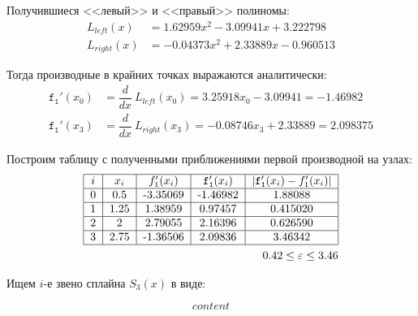 \documentclass[a4paper, 14pt]{article}
\begin{document}
Получившиеся <<левый>> и <<правый>> полиномы:
\begin{align}
    L_{left}(x)  &= 1.62959x^2 - 3.09941x + 3.222798\\
    L_{right}(x) &=-0.04373x^2 + 2.33889x - 0.960513
\end{align}

Тогда производные в крайних точках выражаются аналитически:
\begin{align}
    \mathtt{f_1'}(x_0) &= \dfrac{d}{dx} ~ L_{left}(x_0) = 3.25918x_0 - 3.09941 = -1.46982\\
    \mathtt{f_1'}(x_3) &= \dfrac{d}{dx} ~ L_{right}(x_3)= -0.08746x_3 + 2.33889 = 2.098375
\end{align}

Построим таблицу с полученными приближениями первой производной на узлах:
\begin{align}
    \begin{tabular}{|c|c|c|c|c|}
        \hline
        $i$ & $x_i$ & $f_1'(x_i)$ & $\mathtt{f_1'}(x_i)$ & $|\mathtt{f_1'}(x_i)-f_1'(x_i)|$ \\
        \hline
        0 & 0.5 & -3.35069 & -1.46982 & 1.88088\\
        \hline
        1 &  1.25 & 1.38959 & 0.97457 &0.415020\\
        \hline
        2 &  2 &  2.79055 & 2.16396 &0.626590\\
        \hline
        3 &  2.75 & -1.36506 & 2.09836 &3.46342\\
        \hline
    \end{tabular}\\
    0.42 \le \varepsilon \le 3.46
\end{align}

Ищем $i$-е звено сплайна $S_3(x)$ в виде:

\begin{equation}
    content
\end{equation}
\end{document}
